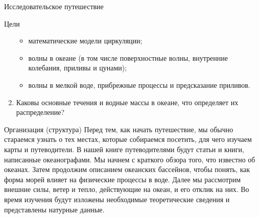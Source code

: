\begin{chapter}{Исследовательское путешествие}
\begin{section}{Цели}
\begin{enumerate}
\begin{itemize}
  \item
  математические модели циркуляции; 
%
  \item
  волны в океане (в том числе поверхностные волны, внутренние колебания, 
  приливы и цунами); 
%

  \item
  волны в мелкой воде, прибрежные процессы и предсказание приливов.
%
\end{itemize}

\item
Каковы основные течения и водные массы в океане, что определяет их 
распределение?
%
\end{enumerate}
\end{section}

\begin{section}{Организация (структура)}
Перед тем, как начать путешествие, мы обычно стараемся узнать о тех местах, 
которые собираемся посетить, для чего изучаем карты и путеводители. 
В нашей книге путеводителями будут статьи и книги, написанные океанографами. 
Мы начнем с краткого обзора того, что известно об океанах. 
Затем продолжим описанием океанских бассейнов, чтобы понять, как форма 
морей влияет на физические процессы в воде. Далее мы рассмотрим внешние силы, 
ветер и тепло, действующие на океан, и его отклик на них. Во время изучения 
будут изложены необходимые теоретические сведения и представлены натурные 
данные.
%



\end{section}
\end{chapter}
